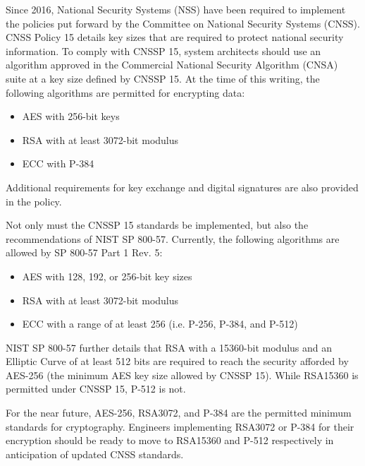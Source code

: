 Since 2016, National Security Systems (NSS) have been required to implement the policies put forward by the Committee on National Security Systems (CNSS). CNSS Policy 15 details key sizes that are required to protect national security information.\autocite{20220328:cnssp15} To comply with CNSSP 15, system architects should use an algorithm approved in the Commercial National Security Algorithm (CNSA) suite at a key size defined by CNSSP 15. At the time of this writing, the following algorithms are permitted for encrypting data:
\begin{itemize}
	\item AES with 256-bit keys
	\item RSA with at least 3072-bit modulus
	\item ECC with P-384
\end{itemize}
Additional requirements for key exchange and digital signatures are also provided in the policy.

Not only must the CNSSP 15 standards be implemented, but also the recommendations of NIST SP 800-57.\autocite{20220328:nist80057p1r5} Currently, the following algorithms are allowed by SP 800-57 Part 1 Rev. 5:
\begin{itemize}
	\item AES with 128, 192, or 256-bit key sizes
	\item RSA with at least 3072-bit modulus
	\item ECC with a range of at least 256 (i.e. P-256, P-384, and P-512)
\end{itemize}
NIST SP 800-57 further details that RSA with a 15360-bit modulus and an Elliptic Curve of at least 512 bits are required to reach the security afforded by AES-256 (the minimum AES key size allowed by CNSSP 15). While RSA15360 is permitted under CNSSP 15, P-512 is not.

For the near future, AES-256, RSA3072, and P-384 are the permitted minimum standards for cryptography. Engineers implementing RSA3072 or P-384 for their encryption should be ready to move to RSA15360 and P-512 respectively in anticipation of updated CNSS standards.
